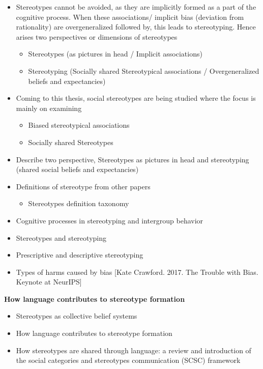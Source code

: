 \begin{itemize}
        \item Stereotypes cannot be avoided, as they are implicitly formed as a part of the cognitive process. When these associations/ implicit bias (deviation from rationality) are overgeneralized followed by, this leads to stereotyping. Hence arises two perspectives or dimensions of stereotypes 
            \begin{itemize}
                \item Stereotypes (as pictures in head / Implicit associations)
                \item Stereotyping (Socially shared Stereotypical associations / Overgeneralized beliefs and expectancies) 
            \end{itemize}
            \item Coming to this thesis, social stereotypes are being studied where the focus is mainly on examining 
            \begin{itemize}
                \item Biased stereotypical associations
                \item Socially shared Stereotypes
            \end{itemize}
\end{itemize}
\begin{itemize}
    \item Describe two perspective, Stereotypes as pictures in head and stereotyping (shared social beliefs and expectancies)
    \item Definitions of stereotype from other papers
        \begin{itemize}
            \item Stereotypes definition taxonomy \cite{ashmore1981conceptual}
        \end{itemize}
    \item Cognitive processes in stereotyping and intergroup behavior \cite{hamilton2015cognitive}
    \item Stereotypes and stereotyping \cite{macrae1996stereotypes}
    \item Prescriptive and descriptive stereotyping
    \item Types of harms caused by bias [Kate Crawford. 2017. The Trouble with Bias. Keynote
at NeurIPS]
\end{itemize}
\textbf{How language contributes to stereotype formation}
    \begin{itemize}
        \item Stereotypes as collective belief systems \cite{macrae1996stereotypes}
        \item How language contributes to stereotype formation \cite{burgers2020language}
        \item How stereotypes are shared through language: a
    review and introduction of the social categories
    and stereotypes communication (SCSC) framework \cite{beukeboom2019stereotypes}
    \end{itemize}
